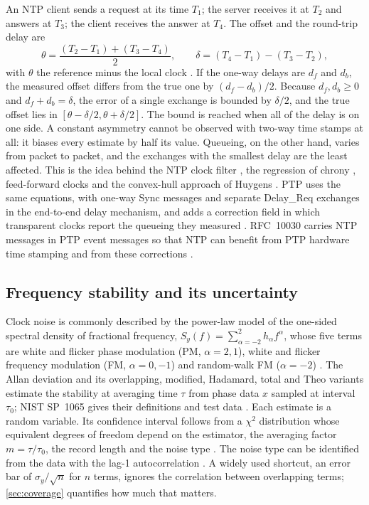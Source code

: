 \documentclass[11pt,a4paper]{article}
\begin{document}
An NTP client sends a request at its time $T_1$; the server receives it at $T_2$ and answers at $T_3$;
the client receives the answer at $T_4$. The offset and the round-trip delay are
\begin{equation}\label{eq:ntp}
\theta = \frac{(T_2 - T_1) + (T_3 - T_4)}{2}, \qquad \delta = (T_4 - T_1) - (T_3 - T_2),
\end{equation}
with $\theta$ the reference minus the local clock \citep{rfc5905}. If the one-way delays are $d_f$ and
$d_b$, the measured offset differs from the true one by $(d_f - d_b)/2$. Because $d_f, d_b \ge 0$ and
$d_f + d_b = \delta$, the error of a single exchange is bounded by $\delta/2$, and the true offset lies
in $[\theta - \delta/2, \theta + \delta/2]$. The bound is reached when all of the delay is on one side.
A constant asymmetry cannot be observed with two-way time stamps at all: it biases every estimate by
half its value. Queueing, on the other hand, varies from packet to packet, and the exchanges with the
smallest delay are the least affected. This is the idea behind the NTP clock filter \citep{rfc5905},
the regression of chrony \citep{chrony}, feed-forward clocks \citep{veitch2009} and the convex-hull
approach of Huygens \citep{geng2018}. PTP uses the same equations, with one-way Sync messages and
separate Delay\_Req exchanges in the end-to-end delay mechanism, and adds a correction field in which
transparent clocks report the queueing they measured \citep{ieee1588}. RFC~10030 carries NTP messages in
PTP event messages so that NTP can benefit from PTP hardware time stamping and from these corrections
\citep{rfc10030}.

\subsection{Frequency stability and its uncertainty}

Clock noise is commonly described by the power-law model of the one-sided spectral density of
fractional frequency, $S_y(f) = \sum_{\alpha=-2}^{2} h_\alpha f^\alpha$, whose five terms are white and
flicker phase modulation (PM, $\alpha = 2, 1$), white and flicker frequency modulation (FM, $\alpha = 0,
-1$) and random-walk FM ($\alpha=-2$) \citep{barnes1971}. The Allan deviation and its overlapping,
modified, Hadamard, total and Theo variants \citep{allan1966,allan1981,howe2000,howe2003theo,howe2006theoh}
estimate the stability at averaging time $\tau$ from phase data $x$ sampled at interval $\tau_0$; NIST
SP~1065 gives their definitions and test data \citep{riley2008}. Each estimate is a random variable. Its
confidence interval follows from a $\chi^2$ distribution whose equivalent degrees of freedom depend on
the estimator, the averaging factor $m = \tau/\tau_0$, the record length and the noise type
\citep{greenhall2003}. The noise type can be identified from the data with the lag-1 autocorrelation
\citep{riley2004}. A widely used shortcut, an error bar of $\sigma_y/\sqrt{n}$ for $n$ terms, ignores the
correlation between overlapping terms; \cref{sec:coverage} quantifies how much that matters.
\end{document}
